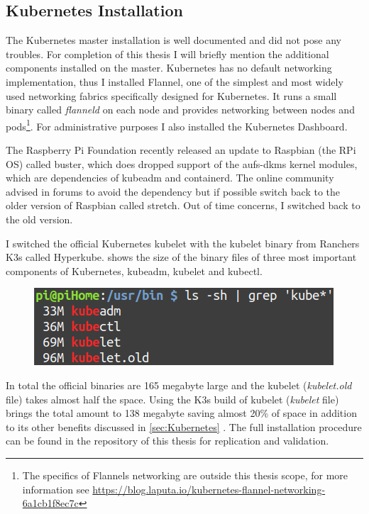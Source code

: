 \subsection{Kubernetes Installation}
The Kubernetes master installation is well documented and did not pose any troubles. For completion of this thesis I will briefly mention the additional components installed on the master. Kubernetes has no default networking implementation, thus I installed Flannel\cite{coreosFlannel:online}, one of the simplest and most widely used networking fabrics specifically designed for Kubernetes. It runs a small binary called \textit{flanneld} on each node and provides networking between nodes and pods\footnote{The specifics of Flannels networking are outside this thesis scope, for more information see \url{https://blog.laputa.io/kubernetes-flannel-networking-6a1cb1f8ec7c}}. For administrative purposes I also installed the Kubernetes Dashboard.

The Raspberry Pi Foundation recently released an update to Raspbian (the RPi OS) called buster, which does dropped support of the aufs-dkms kernel modules, which are dependencies of kubeadm and containerd. The online community advised in forums to avoid the dependency but if possible switch back to the older version of Raspbian called stretch. Out of time concerns, I switched back to the old version. 

I switched the official Kubernetes kubelet with the kubelet binary from Ranchers K3s called Hyperkube.  shows the size of the binary files of three most important components of Kubernetes, kubeadm, kubelet and kubectl.
\begin{figure}[h!]
    \centering
    \includegraphics[scale=0.5]{figures/kubeBinariesSize.png}
    \vspace*{-0.3cm}
    \label{fig:kubeBinaries}
\end{figure}
In total the official binaries are 165 megabyte large and the kubelet (\textit{kubelet.old} file) takes almost half the space. Using the K3s build of kubelet (\textit{kubelet} file) brings the total amount to 138 megabyte saving almost 20\% of space in addition to its other benefits discussed in \cref{sec:Kubernetes} . The full installation procedure can be found in the repository of this thesis for replication and validation.

